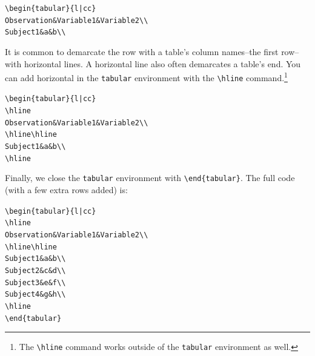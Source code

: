 \begin{knitrout}
\color{fgcolor}\begin{kframe}
\begin{alltt}
\textbackslash{}begin\{tabular\}\{l | c c\}
    Observation & Variable1 & Variable2 \textbackslash{}\textbackslash{}
    Subject1 & a & b \textbackslash{}\textbackslash{}
\end{alltt}
\end{kframe}
\end{knitrout}


\noindent It is common to demarcate the row with a table's column names--the first row--with horizontal lines. A horizontal line also often demarcates a table's end. You can add horizontal in the \texttt{tabular} environment with the \verb|\hline| command.\footnote{The \texttt{\textbackslash{}hline} command works outside of the \texttt{tabular} environment as well.}

\begin{knitrout}
\color{fgcolor}\begin{kframe}
\begin{alltt}
\textbackslash{}begin\{tabular\}\{l | c c\}
    \textbackslash{}hline
    Observation & Variable1 & Variable2 \textbackslash{}\textbackslash{}
    \textbackslash{}hline \textbackslash{}hline
    Subject1 & a & b \textbackslash{}\textbackslash{}
    \textbackslash{}hline
\end{alltt}
\end{kframe}
\end{knitrout}


\noindent Finally, we close the \texttt{tabular} environment with \verb|\end{tabular}|. The full code (with a few extra rows added) is:

\begin{knitrout}
\color{fgcolor}\begin{kframe}
\begin{alltt}
\textbackslash{}begin\{tabular\}\{l | c c\}
    \textbackslash{}hline
    Observation & Variable1 & Variable2 \textbackslash{}\textbackslash{}
    \textbackslash{}hline \textbackslash{}hline
    Subject1 & a & b \textbackslash{}\textbackslash{}
    Subject2 & c & d \textbackslash{}\textbackslash{}
    Subject3 & e & f \textbackslash{}\textbackslash{}
    Subject4 & g & h \textbackslash{}\textbackslash{}
    \textbackslash{}hline
\textbackslash{}end\{tabular\}
\end{alltt}
\end{kframe}
\end{knitrout}


